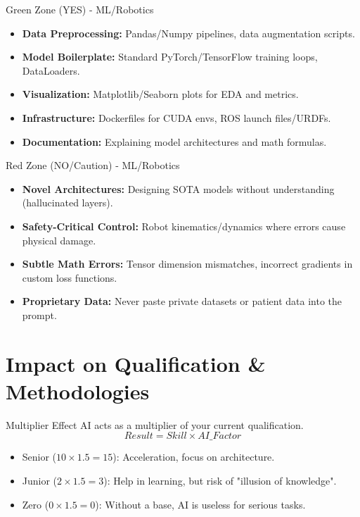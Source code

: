 \documentclass[aspectratio=169]{beamer}
\begin{document}
\begin{frame}[t]{Green Zone (YES) - ML/Robotics}
    \begin{itemize}
        \item \textbf{Data Preprocessing:} Pandas/Numpy pipelines, data augmentation scripts.
        \item \textbf{Model Boilerplate:} Standard PyTorch/TensorFlow training loops, DataLoaders.
        \item \textbf{Visualization:} Matplotlib/Seaborn plots for EDA and metrics.
        \item \textbf{Infrastructure:} Dockerfiles for CUDA envs, ROS launch files/URDFs.
        \item \textbf{Documentation:} Explaining model architectures and math formulas.
    \end{itemize}
\end{frame}

\begin{frame}[t]{Red Zone (NO/Caution) - ML/Robotics}
    \begin{itemize}
        \item \textbf{Novel Architectures:} Designing SOTA models without understanding (hallucinated layers).
        \item \textbf{Safety-Critical Control:} Robot kinematics/dynamics where errors cause physical damage.
        \item \textbf{Subtle Math Errors:} Tensor dimension mismatches, incorrect gradients in custom loss functions.
        \item \textbf{Proprietary Data:} Never paste private datasets or patient data into the prompt.
    \end{itemize}
\end{frame}


\section{Impact on Qualification & Methodologies}

\begin{frame}[t]{Multiplier Effect}
    AI acts as a multiplier of your current qualification.
    $$ Result = Skill \times AI\_Factor $$
    \begin{itemize}
        \item Senior ($10 \times 1.5 = 15$): Acceleration, focus on architecture.
        \item Junior ($2 \times 1.5 = 3$): Help in learning, but risk of "illusion of knowledge".
        \item Zero ($0 \times 1.5 = 0$): Without a base, AI is useless for serious tasks.
    \end{itemize}
\end{frame}
\end{document}
